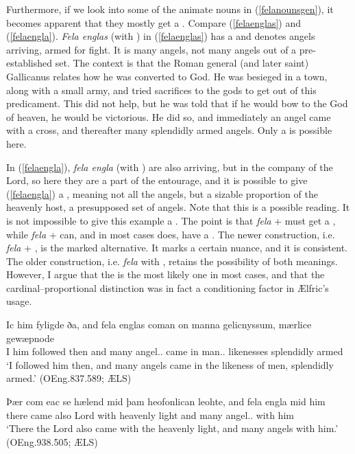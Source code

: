 \documentclass[output=paper,colorlinks,citecolor=brown]{langscibook}
\begin{document}
Furthermore, if we look into some of the animate nouns in (\ref{felanounsgen}), it becomes apparent that they mostly get a . Compare (\ref{felaenglas}) and (\ref{felaengla}). \textit{Fela englas} (with ) in (\ref{felaenglas}) has a  and denotes angels arriving, armed for fight. It is many angels, not many angels out of a pre-established set. The context is that the Roman general (and later saint) Gallicanus relates how he was converted to God. He was besieged in a town, along with a small army, and tried sacrifices to the gods to get out of this predicament. This did not help, but he was told that if he would bow to the God of heaven, he would be victorious. He did so, and immediately an angel came with a cross, and thereafter many splendidly armed angels. Only a  is possible here. 

In (\ref{felaengla}), \textit{fela engla} (with ) are also arriving, but in the company of the Lord, so here they are a part of the entourage, and it is possible to give (\ref{felaengla}) a , meaning not all the angels, but a sizable proportion of the heavenly host, a presupposed set of angels. Note that this is a possible reading. It is not impossible to give this example a . The point is that \textit{fela} +  must get a , while \textit{fela} +  can, and in most cases does, have a . The newer construction, i.e. \textit{fela} + , is the marked alternative. It marks a certain nuance, and it is consistent. The older construction, i.e. \textit{fela} with , retains the possibility of both meanings. However, I argue that the  is the most likely one in most cases, and that the cardinal–proportional distinction was in fact a conditioning factor in Ælfric’s usage.

\ea\label{felaenglas}
\gll Ic him fyligde ða, and fela englas coman on manna gelicnyssum, mærlice gewæpnode\\
I him followed then and many angel.\NOM.\PL{} came in man.\GEN.\PL{} likenesses splendidly armed\\
\glt ‘I followed him then, and many angels came in the likeness of men, splendidly armed.’ (OEng.837.589; ÆLS)
\z

\ea\label{felaengla}
\gll Þær com eac se hælend mid þam heofonlican leohte, and fela engla mid him\\
there came also \DEF{} Lord with \DEF{} heavenly light and many angel.\GEN.\PL{} with him\\
\glt ‘There the Lord also came with the heavenly light, and many angels with him.’ (OEng.938.505; ÆLS)
\z
\end{document}
